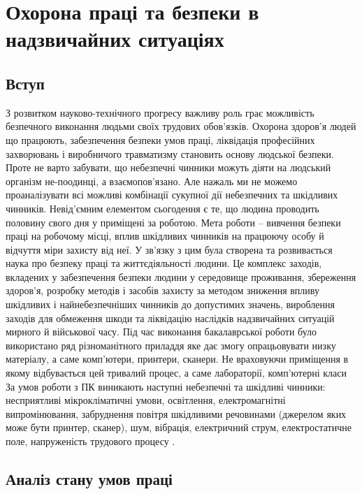 \documentclass[12pt,a4paper]{article}
\begin{document}
\clearpage

\section{Охорона праці та безпеки в надзвичайних ситуаціях}

\subsection{Вступ}
З розвитком науково-технічного прогресу важливу роль грає можливість безпечного виконання людьми своїх трудових обов'язків.
Охорона здоров'я людей що працюють, забезпечення безпеки умов праці, ліквідація професійних захворювань і виробничого травматизму становить основу людської безпеки. Проте не варто забувати, що небезпечні чинники можуть діяти на людський організм не-поодинці, а взаємопов’язано. Але нажаль ми не можемо проаналізувати всі можливі комбінації сукупної дії небезпечних та шкідливих чинників. Невід’ємним елементом сьогодення є те, що людина проводить половину свого дня у приміщені за роботою.
Мета роботи – вивчення безпеки праці на робочому місці, вплив шкідливих чинників на працюючу особу й відчуття міри захисту від неї.
У зв’язку з цим була створена та розвивається наука про безпеку праці та життєдіяльності людини. Це комплекс заходів, вкладених у забезпечення безпеки людини у середовище проживання, збереження здоров'я, розробку методів і засобів захисту за методом зниження впливу шкідливих і найнебезпечніших чинників до допустимих значень, вироблення заходів для обмеження шкоди та ліквідацію наслідків надзвичайних ситуацій мирного й військової часу.
Під час виконання бакалаврської роботи було використано ряд різноманітного приладдя яке дає змогу опрацьовувати низку матеріалу, а саме комп’ютери, принтери, сканери. Не враховуючи приміщення в якому відбувається цей тривалий процес, а саме лабораторії, комп’ютерні класи
За умов роботи з ПК виникають наступні небезпечні та шкідливі чинники: несприятливі мікрокліматичні умови, освітлення, електромагнітні випромінювання, забруднення повітря шкідливими речовинами (джерелом яких може бути принтер, сканер), шум, вібрація, електричний струм, електростатичне поле, напруженість трудового процесу .


\subsection{Аналіз стану умов праці}
\end{document}
